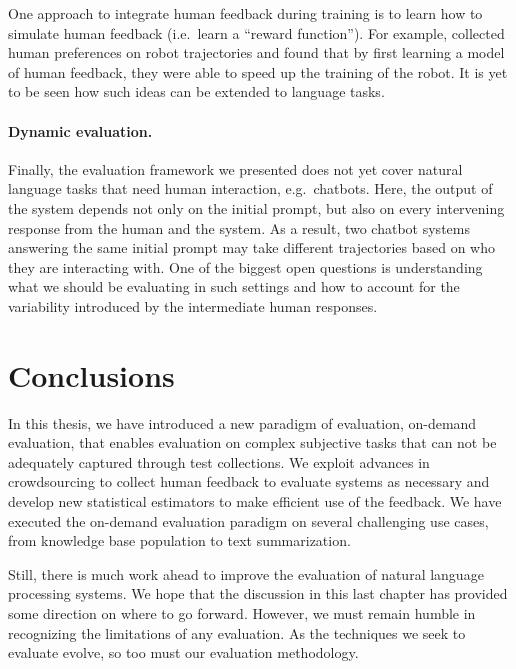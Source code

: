 One approach to integrate human feedback during training is to learn how to simulate human feedback (i.e.\ learn a ``reward function'').
For example, \citet{christiano2017deep} collected human preferences on robot trajectories and found that by first learning a model of human feedback, they were able to speed up the training of the robot.
It is yet to be seen how such ideas can be extended to language tasks.

\paragraph{Dynamic evaluation.}
Finally, the evaluation framework we presented does not yet cover natural language tasks that need human interaction, e.g.\ chatbots.
Here, the output of the system depends not only on the initial prompt, but also on every intervening response from the human and the system.
As a result, two chatbot systems answering the same initial prompt may take different trajectories based on who they are interacting with.
One of the biggest open questions is understanding what we should be evaluating in such settings and how to account for the variability introduced by the intermediate human responses.

\section{Conclusions}
In this thesis, we have introduced a new paradigm of evaluation, on-demand evaluation, that enables evaluation on complex subjective  tasks that can not be adequately captured through test collections.
We exploit advances in crowdsourcing to collect human feedback to evaluate systems as necessary and develop new statistical estimators to make efficient use of the feedback.
We have executed the on-demand evaluation paradigm on several challenging use cases, from knowledge base population to text summarization.

Still, there is much work ahead to improve the evaluation of natural language processing systems.
We hope that the discussion in this last chapter has provided some direction on where to go forward.
However, we must remain humble in recognizing the limitations of any evaluation.
As the techniques we seek to evaluate evolve, so too must our evaluation methodology.
